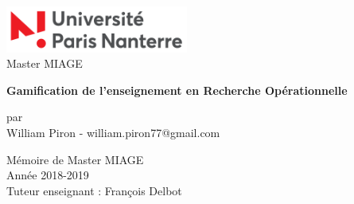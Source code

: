 \begin{titlepage}
\includegraphics[width=60mm,scale=0.5]{Images/Logo_Universite_Paris-Nanterre.png}\\
\vspace{2cm}
Master MIAGE
    \begin{center}
        \vspace*{1cm}
        
        {\LARGE \textbf{Gamification de l'enseignement en Recherche Opérationnelle}}
        
        \vspace{0.5cm}
        
        \vspace{1.5cm}
        par \\
        \vspace{1.5cm}
       William Piron - william.piron77@gmail.com
                
        \vspace{1.0cm}
    \end{center}

\vfill
\textcolor[rgb]{0.5,0.5,0.5}{
    \begin{flushleft}
    { \small
    Mémoire de Master MIAGE \\
    Année 2018-2019 \\
    Tuteur enseignant : François Delbot \\
    }
    \end{flushleft}
}
      
\end{titlepage}